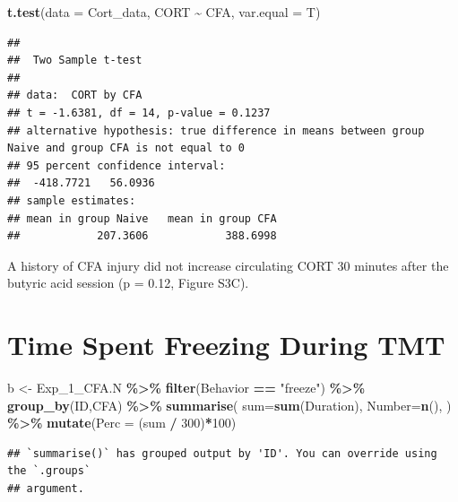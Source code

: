 \documentclass[
]{book}
\newenvironment{Shaded}{\begin{snugshade}}{\end{snugshade}}
\newcommand{\AttributeTok}[1]{\textcolor[rgb]{0.13,0.29,0.53}{#1}}
\newcommand{\DecValTok}[1]{\textcolor[rgb]{0.00,0.00,0.81}{#1}}
\newcommand{\FunctionTok}[1]{\textcolor[rgb]{0.13,0.29,0.53}{\textbf{#1}}}
\newcommand{\NormalTok}[1]{#1}
\newcommand{\OtherTok}[1]{\textcolor[rgb]{0.56,0.35,0.01}{#1}}
\newcommand{\SpecialCharTok}[1]{\textcolor[rgb]{0.81,0.36,0.00}{\textbf{#1}}}
\newcommand{\StringTok}[1]{\textcolor[rgb]{0.31,0.60,0.02}{#1}}
\begin{document}
\begin{Shaded}
\begin{Highlighting}[]
\FunctionTok{t.test}\NormalTok{(}\AttributeTok{data =}\NormalTok{ Cort\_data, CORT }\SpecialCharTok{\textasciitilde{}}\NormalTok{ CFA, }\AttributeTok{var.equal =}\NormalTok{ T)}
\end{Highlighting}
\end{Shaded}

\begin{verbatim}
## 
##  Two Sample t-test
## 
## data:  CORT by CFA
## t = -1.6381, df = 14, p-value = 0.1237
## alternative hypothesis: true difference in means between group Naive and group CFA is not equal to 0
## 95 percent confidence interval:
##  -418.7721   56.0936
## sample estimates:
## mean in group Naive   mean in group CFA 
##            207.3606            388.6998
\end{verbatim}

A history of CFA injury did not increase circulating CORT 30 minutes after the butyric acid session (p = 0.12, Figure S3C).

\section*{Time Spent Freezing During TMT}\label{time-spent-freezing-during-tmt-1}

\begin{Shaded}
\begin{Highlighting}[]
\NormalTok{b }\OtherTok{\textless{}{-}}\NormalTok{ Exp\_1\_CFA.N  }\SpecialCharTok{\%\textgreater{}\%}
  \FunctionTok{filter}\NormalTok{(Behavior }\SpecialCharTok{==} \StringTok{"freeze"}\NormalTok{) }\SpecialCharTok{\%\textgreater{}\%}
  \FunctionTok{group\_by}\NormalTok{(ID,CFA) }\SpecialCharTok{\%\textgreater{}\%}
  \FunctionTok{summarise}\NormalTok{(}
    \AttributeTok{sum=}\FunctionTok{sum}\NormalTok{(Duration),}
    \AttributeTok{Number=}\FunctionTok{n}\NormalTok{(),}
\NormalTok{  ) }\SpecialCharTok{\%\textgreater{}\%}
  \FunctionTok{mutate}\NormalTok{(}\AttributeTok{Perc =}\NormalTok{ (sum }\SpecialCharTok{/} \DecValTok{300}\NormalTok{)}\SpecialCharTok{*}\DecValTok{100}\NormalTok{) }
\end{Highlighting}
\end{Shaded}

\begin{verbatim}
## `summarise()` has grouped output by 'ID'. You can override using the `.groups`
## argument.
\end{verbatim}
\end{document}
